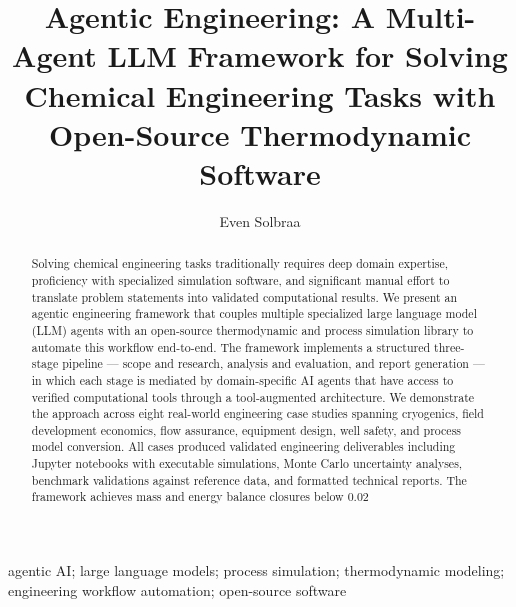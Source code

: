 \documentclass[review,3p]{elsarticle}
\begin{document}
\linenumbers
\doublespacing

\begin{frontmatter}

\title{Agentic Engineering: A Multi-Agent LLM Framework for Solving Chemical Engineering Tasks with Open-Source Thermodynamic Software}

\author[inst1]{Even Solbraa}


\begin{abstract}
Solving chemical engineering tasks traditionally requires deep domain expertise, proficiency with specialized simulation software, and significant manual effort to translate problem statements into validated computational results. We present an agentic engineering framework that couples multiple specialized large language model (LLM) agents with an open-source thermodynamic and process simulation library to automate this workflow end-to-end. The framework implements a structured three-stage pipeline --- scope and research, analysis and evaluation, and report generation --- in which each stage is mediated by domain-specific AI agents that have access to verified computational tools through a tool-augmented architecture. We demonstrate the approach across eight real-world engineering case studies spanning cryogenics, field development economics, flow assurance, equipment design, well safety, and process model conversion. All cases produced validated engineering deliverables including Jupyter notebooks with executable simulations, Monte Carlo uncertainty analyses, benchmark validations against reference data, and formatted technical reports. The framework achieves mass and energy balance closures below 0.02%
\end{abstract}

\begin{keyword}
agentic AI; large language models; process simulation; thermodynamic modeling; engineering workflow automation; open-source software
\end{keyword}


\end{frontmatter}
\end{document}
